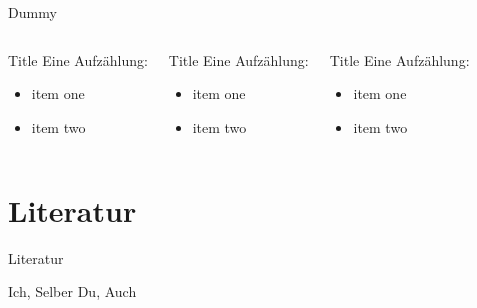 \documentclass{beamer}
\begin{document}
\begin{frame}{Dummy}
  \begin{columns}
  \begin{block}{Title}
    Eine Aufzählung:\\
    \begin{itemize}
      \item item one
      \item item two
    \end{itemize}
  \end{block}
  \begin{exampleblock}{Title}
    Eine Aufzählung:\\
    \begin{itemize}
      \item item one
      \item item two
    \end{itemize}
  \end{exampleblock}
  \begin{alertblock}{Title}
    Eine Aufzählung:\\
    \begin{itemize}
      \item item one
      \item item two
    \end{itemize}
  \end{alertblock}
  \end{columns}
\end{frame}

\section{Literatur}

\begin{frame}{Literatur}
\begin{thebibliography}{sodeep}
   Ich, Selber
   Du, Auch
\end{thebibliography}
\end{frame}
\end{document}
